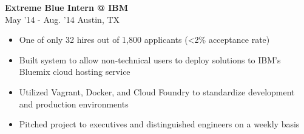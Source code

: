 \documentclass[a4paper,10pt]{article}
\newenvironment{details}
{\begin{itemize}[label=\scalebox{.5}{\ding{117}},leftmargin=0.15in]}
{\end{itemize}}
\begin{document}
\begin{minipage}[t]{0.5\textwidth}
{\fontsize{14}{16}\selectfont \textbf{Extreme Blue Intern @ IBM}}\\
May '14 - Aug. '14 \textbar\enspace Austin, TX

\begin{details}
  \item One of only 32 hires out of 1,800 applicants (\textless2\% acceptance rate)
  \item Built system to allow non-technical users to deploy solutions to IBM's Bluemix cloud hosting service
  \item Utilized Vagrant, Docker, and Cloud Foundry to standardize development and production environments
  \item Pitched project to executives and distinguished engineers on a weekly basis
\end{details}

\end{minipage}
\hspace{0.35 in}
\end{document}
